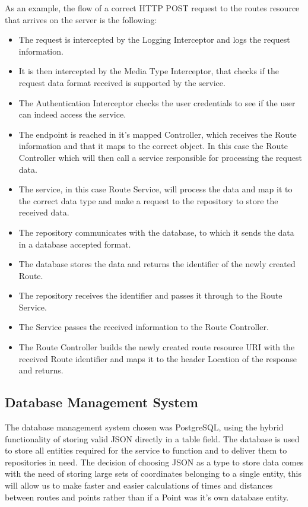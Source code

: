 As an example, the flow of a correct HTTP POST request to the routes resource that arrives on the server is the following:
    \begin{itemize}
        \item The request is intercepted by the Logging Interceptor and logs the request information.
        \item It is then intercepted by the Media Type Interceptor, that checks if the request data format received is supported by the service.
        \item The Authentication Interceptor checks the user credentials to see if the user can indeed access the service.
        \item The endpoint is reached in it's mapped Controller, which receives the Route information and that it maps to the correct object. In this case the Route Controller which will then call a service responsible for processing the request data.
        \item The service, in this case Route Service, will process the data and map it  to the correct data type and make a request to the repository to store the received data.
        \item The repository communicates with the database, to which it sends the data in a database accepted format.
        \item The database stores the data and returns the identifier of the newly created Route.
        \item The repository receives the identifier and passes it through to the Route Service.
        \item The Service passes the received information to the Route Controller.
        \item The Route Controller builds the newly created route resource URI with the received Route identifier and maps it to the header Location of the response and returns.
    \end{itemize}

\subsection*{Database Management System}
The database management system chosen was PostgreSQL, using the hybrid functionality of storing valid JSON directly in a table
 field. The database is used to store all entities required for the service to function and to deliver them to repositories in need. 
The decision of choosing JSON as a type to store data comes with the need of storing large sets of coordinates belonging to a single entity, 
this will allow us to make faster and easier calculations of times and distances between routes and points rather than if a Point was it's own database entity. 

